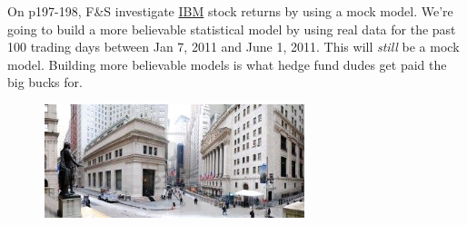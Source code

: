 \documentclass[12pt]{article}
\begin{document}
\problem On p197-198, F\&S investigate \href{http://finance.yahoo.com/q/hp?s=IBM+Historical+Prices}{IBM} stock returns by using a mock model. We're going to build a more believable statistical model by using real data for the past 100 trading days between Jan 7, 2011 and June 1, 2011. This will \textit{still} be a mock model. Building more believable models is what hedge fund dudes get paid the big bucks for.

\begin{figure}[htp]
\centering
\includegraphics[width=3in, height=1.3in]{wallstreet.jpg}
\end{figure}
\FloatBarrier
\end{document}
